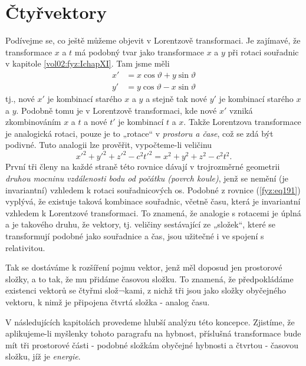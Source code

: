   \section{Čtyřvektory}\label{fyz:IchapXVsecIX}
    Podívejme se, co ještě můžeme objevit v Lorentzově transformaci. Je zajímavé, že transformace
    \(x\) a \(t\) má podobný tvar jako transformace \(x\) a \(y\) při rotaci souřadnic v kapitole
    \ref{vol02:fyz:IchapXI}. Tam jsme měli
    \begin{align}
       x' &= x\cos\vartheta + y\sin\vartheta             \nonumber \\
       y' &= y\cos\vartheta - x\sin\vartheta             \label{fyz:eq190}
    \end{align}
    tj., nové \(x'\) je kombinací starého \(x\) a \(y\) a stejně tak nové \(y'\) je kombinací 
    starého \(x\) a \(y\). Podobně tomu je v Lorentzově transformaci, kde nové \(x'\) vzniká 
    zkombinováním \(x\) a \(t\) a nové \(t'\) je kombinací \(t\) a \(x\). Takže Lorentzova 
    transformace je analogická rotaci, pouze je to „rotace“ v \emph{prostoru a čase}, což se zdá 
    být podivné. Tuto analogii lze prověřit, vypočteme-li veličinu
    \begin{equation}\label{fyz:eq191}
      x'^2 + y'^2 + z'^2 -c^2t'^2 = x^2 + y^2 + z^2 - c^2t^2.
    \end{equation}
    První tři členy na každé straně této rovnice dávají v trojrozměrné geometrii \emph{druhou 
    mocninu vzdálenosti bodu od počátku (povrch koule)}, jenž se nemění (je invariantní) vzhledem k 
    rotaci souřadnicových os. Podobné z rovnice (\ref{fyz:eq191}) vyplývá, že existuje taková 
    kombinace souřadnic, včetně času, která je invariantní vzhledem k Lorentzové transformaci. To 
    znamená, že analogie s rotacemi je úplná a je takového druhu, že vektory, tj. veličiny 
    sestávající ze „složek“, které se transformují podobné jako souřadnice a čas, jsou užitečné i 
    ve spojení s relativitou.
    
    Tak se dostáváme k rozšíření pojmu vektor, jenž měl doposud jen prostorové složky, a to tak, že 
    mu přidáme časovou složku. To znamená, že předpokládáme existenci vektorů se čtyřmi slož¬kami, 
    z nichž tři jsou jako složky obyčejného vektoru, k nimž je připojena čtvrtá složka - analog 
    času.
    
    V následujících kapitolách provedeme hlubší analýzu této koncepce. Zjistíme, že aplikujeme-li 
    myšlenky tohoto paragrafu na hybnost, příslušná transformace bude mít tři prostorové části - 
    podobné složkám obyčejné hybnosti a čtvrtou - časovou složku, jíž je \emph{energie}.
     

